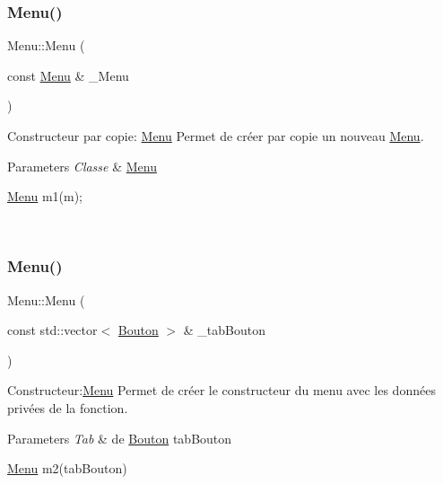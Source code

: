 \subsubsection{\texorpdfstring{Menu()}{Menu()}\hspace{0.1cm}{\footnotesize\ttfamily [2/3]}}
{\footnotesize\ttfamily Menu\+::\+Menu (\begin{DoxyParamCaption}\item[{const \hyperlink{classMenu}{Menu} \&}]{\+\_\+\+Menu }\end{DoxyParamCaption})}



Constructeur par copie\+: \hyperlink{classMenu}{Menu} Permet de créer par copie un nouveau \hyperlink{classMenu}{Menu}. 


\begin{DoxyParams}{Parameters}
{\em Classe} & \hyperlink{classMenu}{Menu} 
\begin{DoxyCode}
\hyperlink{classMenu}{Menu} m1(m);
\end{DoxyCode}
 \\
\hline
\end{DoxyParams}
\mbox{\label{classMenu_a51e725eafe16d272ea48c377a1d3aeff}} 
\subsubsection{\texorpdfstring{Menu()}{Menu()}\hspace{0.1cm}{\footnotesize\ttfamily [3/3]}}
{\footnotesize\ttfamily Menu\+::\+Menu (\begin{DoxyParamCaption}\item[{const std\+::vector$<$ \hyperlink{classBouton}{Bouton} $>$ \&}]{\+\_\+tab\+Bouton }\end{DoxyParamCaption})}



Constructeur\+:\hyperlink{classMenu}{Menu} Permet de créer le constructeur du menu avec les données privées de la fonction. 


\begin{DoxyParams}{Parameters}
{\em Tab} & de \hyperlink{classBouton}{Bouton} tab\+Bouton 
\begin{DoxyCode}
\hyperlink{classMenu}{Menu} m2(tabBouton)
\end{DoxyCode}
 \\
\hline
\end{DoxyParams}


